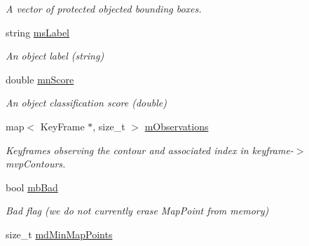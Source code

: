\begin{DoxyCompactItemize}
\begin{DoxyCompactList}\small\item\em A vector of protected objected bounding boxes. \end{DoxyCompactList}\item 
string \hyperlink{classMapObject_a9b8f82a72ac70196277cebe342710eca}{ms\+Label}\hypertarget{classMapObject_a9b8f82a72ac70196277cebe342710eca}{}\label{classMapObject_a9b8f82a72ac70196277cebe342710eca}

\begin{DoxyCompactList}\small\item\em An object label (string) \end{DoxyCompactList}\item 
double \hyperlink{classMapObject_a7184e11e2cad627be0498cf3762128ef}{mn\+Score}\hypertarget{classMapObject_a7184e11e2cad627be0498cf3762128ef}{}\label{classMapObject_a7184e11e2cad627be0498cf3762128ef}

\begin{DoxyCompactList}\small\item\em An object classification score (double) \end{DoxyCompactList}\item 
map$<$ Key\+Frame $\ast$, size\+\_\+t $>$ \hyperlink{classMapObject_a60dfd51ecac5d82d48622126b3c5390a}{m\+Observations}\hypertarget{classMapObject_a60dfd51ecac5d82d48622126b3c5390a}{}\label{classMapObject_a60dfd51ecac5d82d48622126b3c5390a}

\begin{DoxyCompactList}\small\item\em Keyframes observing the contour and associated index in keyframe-\/$>$mvp\+Contours. \end{DoxyCompactList}\item 
bool \hyperlink{classMapObject_aad165a6f92f16e207f771773b44cf534}{mb\+Bad}\hypertarget{classMapObject_aad165a6f92f16e207f771773b44cf534}{}\label{classMapObject_aad165a6f92f16e207f771773b44cf534}

\begin{DoxyCompactList}\small\item\em Bad flag (we do not currently erase Map\+Point from memory) \end{DoxyCompactList}\item 
size\+\_\+t \hyperlink{classMapObject_aac6c58c4548652eb4a816ab3a85d9489}{md\+Min\+Map\+Points}\hypertarget{classMapObject_aac6c58c4548652eb4a816ab3a85d9489}{}\label{classMapObject_aac6c58c4548652eb4a816ab3a85d9489}


\end{DoxyCompactItemize}

